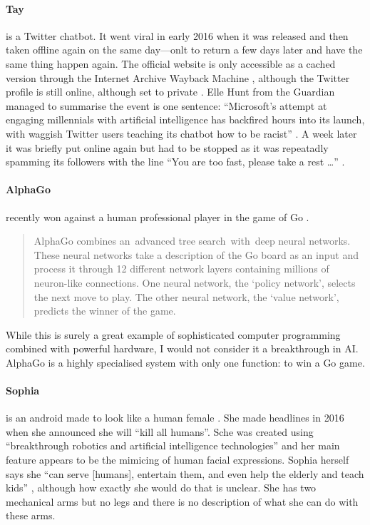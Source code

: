 \paragraph{Tay} is a Twitter chatbot. It went viral in early 2016 when it was released and then taken offline again on the same day---onlt to return a few days later and have the same thing happen again. The official website is only accessible as a cached version through the Internet Archive Wayback Machine \autocite{Tay2016}, although the Twitter profile is still online, although set to private \autocite{Tayandyou2016}. Elle Hunt from the Guardian managed to summarise the event is one sentence: ``Microsoft's attempt at engaging millennials with artificial intelligence has backfired hours into its launch, with waggish Twitter users teaching its chatbot how to be racist'' \autocite{Hunt2016}. A week later it was briefly put online again but had to be stopped as it was repeatadly spamming its followers with the line ``You are too fast, please take a rest \ldots'' \autocite{Gibbs2016}.

\paragraph{AlphaGo} recently won against a human professional player in the game of Go \autocite{DeepMind2016,Hassabis2016}. 

\begin{quotation}
  AlphaGo combines an advanced tree search with deep neural networks. These neural networks take a description of the Go board as an input and process it through 12 different network layers containing millions of neuron-like connections. One neural network, the `policy network', selects the next move to play. The other neural network, the `value network', predicts the winner of the game. 
\end{quotation}

While this is surely a great example of sophisticated computer programming combined with powerful hardware, I would not consider it a breakthrough in \ac{AI}. AlphaGo is a highly specialised system with only one function: to win a Go game.

\paragraph{Sophia} is an android made to look like a human female \autocite{Sophia2016,Hanson2016}. She made headlines in 2016 when she announced she will ``kill all humans''. Sche was created using ``breakthrough robotics and artificial intelligence technologies'' and her main feature appears to be the mimicing of human facial expressions. Sophia herself says she ``can serve [humans], entertain them, and even help the elderly and teach kids'' \autocite*{Sophia2016}, although how exactly she would do that is unclear. She has two mechanical arms but no legs and there is no description of what she can do with these arms.

